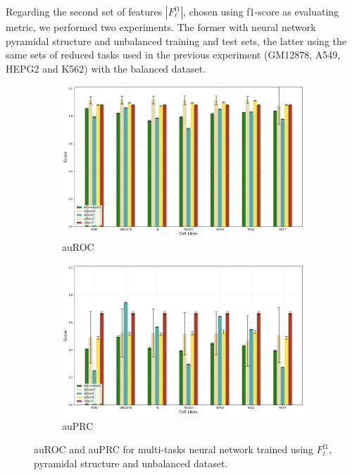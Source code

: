 Regarding the second set of features $|F_\ell^{\textrm{f1}}|$, chosen using f1-score as evaluating metric, we performed two experiments. The former with neural network pyramidal structure and unbalanced training and test sets, the latter using the same sets of reduced tasks used in the previous experiment (GM12878, A549, HEPG2 and K562) with the balanced dataset. 
\begin{figure}[!htbp]
    \centering
    \begin{subfigure}[b]{\textwidth}
        \includegraphics[width=\textwidth]{images/results_plots/new_features_auroc.png}
        \caption{auROC}
        \label{fig:auroc_newfeatures}
    \end{subfigure}
    \begin{subfigure}[b]{\textwidth}
        \includegraphics[width=\textwidth]{images/results_plots/new_features_auprc.png}
        \caption{auPRC}
        \label{fig:auprc_newfeatures}
    \end{subfigure}
    \caption{auROC and auPRC for multi-tasks neural network trained using $F_\ell^{\textrm{f1}}$, pyramidal structure and unbalanced dataset.}\label{fig:newfeatures_results}
\end{figure}
